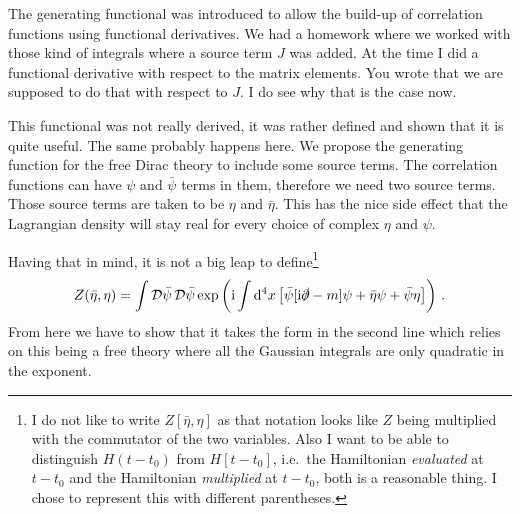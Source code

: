 \documentclass[11pt, english, fleqn, DIV=15, headinclude]{scrartcl}
\begin{document}
The generating functional was introduced to allow the build-up of correlation
functions using functional derivatives. We had a homework where we worked with
those kind of integrals where a source term $J$ was added. At the time I did a
functional derivative with respect to the matrix elements. You wrote that we
are supposed to do that with respect to $J$. I do see why that is the case now.

This functional was not really derived, it was rather defined and shown that it
is quite useful. The same probably happens here. We propose the generating
function for the free Dirac theory to include some source terms. The
correlation functions can have $\psi$ and $\bar\psi$ terms in them, therefore
we need two source terms. Those source terms are taken to be $\eta$ and
$\bar\eta$. This has the nice side effect that the Lagrangian density will stay
real for every choice of complex $\eta$ and $\psi$.

Having that in mind, it is not a big leap to define\footnote{%
    I do not like to write $Z[\bar\eta, \eta]$ as that notation looks like $Z$
    being multiplied with the commutator of the two variables. Also I want to
    be able to distinguish $H(t - t_0)$ from $H[t - t_0]$, i.e.\ the
    Hamiltonian \emph{evaluated} at $t - t_0$ and the Hamiltonian
    \emph{multiplied} at $t - t_0$, both is a reasonable thing. I chose to
    represent this with different parentheses.
}
\[
    Z(\bar\eta, \eta) = \int \mathcal D \bar\psi \, \mathcal D \bar\psi
    \exp\left( \mathrm i \int \mathop{}\!\mathrm d^4 x \left[ \bar\psi [\mathrm i \slashed\partial - m]
    \psi + \bar\eta \psi + \bar\psi \eta \right] \right) \,.
\]
From here we have to show that it takes the form in the second line which
relies on this being a free theory where all the Gaussian integrals are only
quadratic in the exponent.
\end{document}
